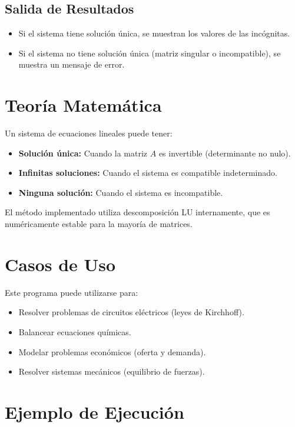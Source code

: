 \documentclass[12pt]{article}
\begin{document}
	\subsection{Salida de Resultados}
	
	\begin{itemize}
		\item Si el sistema tiene solución única, se muestran los valores de las incógnitas.
		\item Si el sistema no tiene solución única (matriz singular o incompatible), se muestra un mensaje de error.
	\end{itemize}
	
	\section{Teoría Matemática}
	
	Un sistema de ecuaciones lineales puede tener:
	
	\begin{itemize}
		\item \textbf{Solución única:} Cuando la matriz $A$ es invertible (determinante no nulo).
		\item \textbf{Infinitas soluciones:} Cuando el sistema es compatible indeterminado.
		\item \textbf{Ninguna solución:} Cuando el sistema es incompatible.
	\end{itemize}
	
	El método implementado utiliza descomposición LU internamente, que es numéricamente estable para la mayoría de matrices.
	
	\section{Casos de Uso}
	
	Este programa puede utilizarse para:
	
	\begin{itemize}
		\item Resolver problemas de circuitos eléctricos (leyes de Kirchhoff).
		\item Balancear ecuaciones químicas.
		\item Modelar problemas económicos (oferta y demanda).
		\item Resolver sistemas mecánicos (equilibrio de fuerzas).
	\end{itemize}
	
	\section{Ejemplo de Ejecución}
	
\end{document}

